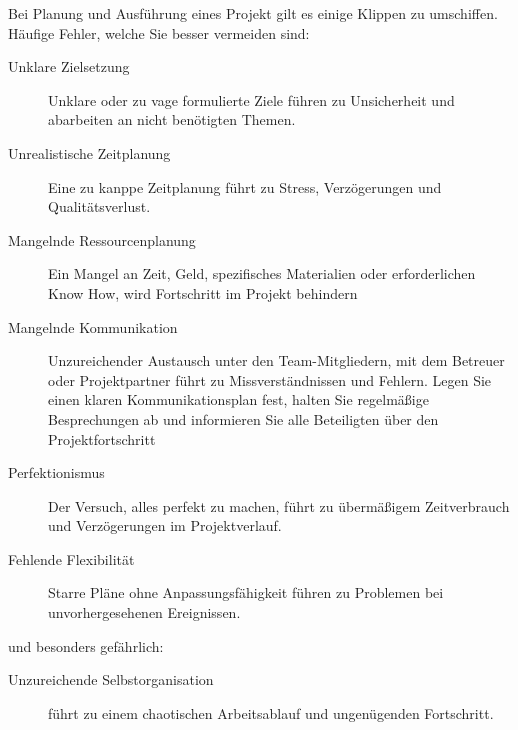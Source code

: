 \renewcommand*{\authorOfNextLines}{Helmut Quinz}
Bei Planung und Ausführung eines Projekt gilt es einige Klippen zu umschiffen.
Häufige Fehler, welche Sie besser vermeiden  sind:
\begin{description}
	\item[Unklare Zielsetzung] Unklare oder zu vage formulierte Ziele führen zu Unsicherheit und abarbeiten an nicht benötigten Themen.
	\item[Unrealistische Zeitplanung] Eine zu kanppe Zeitplanung führt zu Stress, Verzögerungen und Qualitätsverlust.
	\item[Mangelnde Ressourcenplanung] Ein Mangel an Zeit, Geld, spezifisches Materialien oder erforderlichen Know How, wird Fortschritt im Projekt behindern
	\item[Mangelnde Kommunikation] Unzureichender Austausch unter den Team-Mitgliedern, mit dem Betreuer oder Projektpartner führt zu Missverständnissen und Fehlern.
				Legen Sie einen klaren Kommunikationsplan fest, halten Sie regelmäßige Besprechungen ab und informieren Sie alle Beteiligten über den Projektfortschritt
	\item[Perfektionismus] Der Versuch, alles perfekt zu machen, führt zu übermäßigem Zeitverbrauch und Verzögerungen im Projektverlauf.
	\item[Fehlende Flexibilität] Starre Pläne ohne Anpassungsfähigkeit führen zu Problemen bei unvorhergesehenen Ereignissen.
	
\end{description}
und besonders gefährlich:
\begin{description}
	\item[Unzureichende Selbstorganisation] führt zu einem chaotischen Arbeitsablauf und ungenügenden Fortschritt.
\end{description}